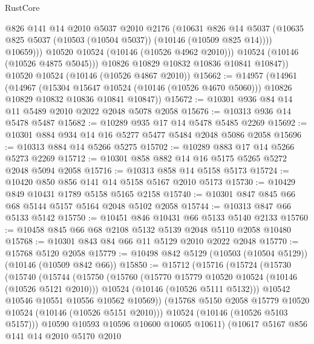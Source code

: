 \begin{lexlean}{RustCore}
\begin{coremodule}
                  @826
                  @141
                  @14
                  @2010
                  @5037
                  @2010
                  @2176
                  (@10631
                    @826
                    @14
                    @5037
                    (@10635 @825 @5037 (@10503 (@10504 @5037)) (@10146 (@10509 @825 @14))))
                  @10659)))
            @10520
            @10524
            (@10146 (@10526 @4962 @2010)))
          @10524
          (@10146 (@10526 @4875 @5045)))
        @10826
        @10829
        @10832
        @10836
        @10841
        @10847))
    @10520
    @10524
    (@10146 (@10526 @4867 @2010))
@15662 := @14957
    (@14961
      (@14967
        (@15304 @15647 @10524 (@10146 (@10526 @4670 @5060)))
        @10826
        @10829
        @10832
        @10836
        @10841
        @10847))
@15672 := @10301 @936 @84 @14 @11 @5489 @2010 @2022 @2048 @5078 @2058
@15676 := @10313 @936 @14 @5478 @5487
@15682 := @10289 @935 @17 @14 @5478 @5485 @2269
@15692 := @10301 @884 @934 @14 @16 @5277 @5477 @5484 @2048 @5086 @2058
@15696 := @10313 @884 @14 @5266 @5275
@15702 := @10289 @883 @17 @14 @5266 @5273 @2269
@15712 := @10301 @858 @882 @14 @16 @5175 @5265 @5272 @2048 @5094 @2058
@15716 := @10313 @858 @14 @5158 @5173
@15724 := @10420 @850 @856 @141 @14 @5158 @5167 @2010 @5173
@15730 := @10429 @849 @10431 @1789 @5158 @5165 @2158
@15740 := @10301 @847 @845 @66 @68 @5144 @5157 @5164 @2048 @5102 @2058
@15744 := @10313 @847 @66 @5133 @5142
@15750 := @10451 @846 @10431 @66 @5133 @5140 @2133
@15760 := @10458 @845 @66 @68 @2108 @5132 @5139 @2048 @5110 @2058 @10480
@15768 := @10301 @843 @84 @66 @11 @5129 @2010 @2022 @2048
@15770 := @15768 @5120 @2058
@15779 := @10498 @842 @5129 (@10503 (@10504 @5129)) (@10146 (@10509 @842 @66))
@15850 := @15712
    (@15716
      (@15724
        (@15730
          (@15740
            (@15744
              (@15750
                (@15760
                  (@15770 @15779 @10520 @10524 (@10146 (@10526 @5121 @2010)))
                  @10524
                  (@10146 (@10526 @5111 @5132)))
                @10542
                @10546
                @10551
                @10556
                @10562
                @10569))
            (@15768 @5150 @2058 @15779 @10520 @10524 (@10146 (@10526 @5151 @2010)))
            @10524
            (@10146 (@10526 @5103 @5157)))
          @10590
          @10593
          @10596
          @10600
          @10605
          @10611)
        (@10617
          @5167
          @856
          @141
          @14
          @2010
          @5170
          @2010

\end{coremodule}
\end{lexlean}
